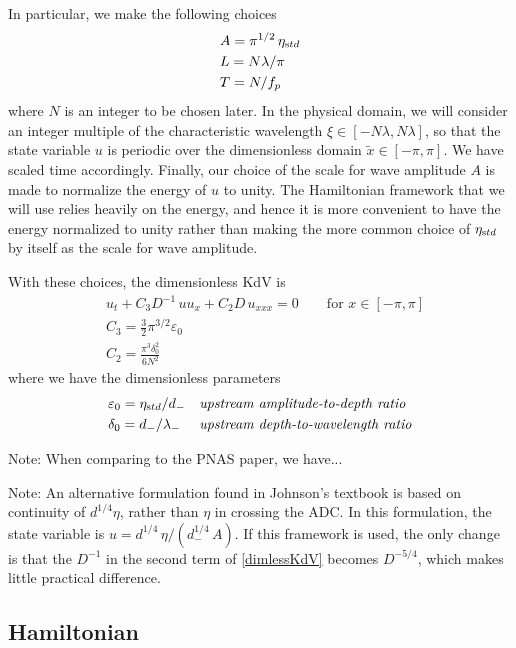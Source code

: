 \documentclass[11pt]{article}
\newcommand{\eps}{\varepsilon}
\newcommand{\freqp}{f_p}
\newcommand{\ampscale}{A}
\newcommand{\etastd}{\eta_{\text std}}
\newcommand{\depth}{d}
\newcommand{\dup}{\depth_{-}}
\newcommand{\lam}{\lambda}
\newcommand{\lamup}{\lam_{-}}
\newcommand{\lamfac}{N}
\newcommand{\drat}{D}
\newcommand{\epsup}{\eps_0}
\newcommand{\delup}{\delta_0}
\begin{document}
In particular, we make the following choices
\begin{align}
&\ampscale = \pi^{1/2} \, \etastd \\
&L = \lamfac \lam / \pi \\
&T = \lamfac / \freqp
\end{align}
where $\lamfac$ is an integer to be chosen later. In the physical domain, we will consider an integer multiple of the characteristic wavelength $\xi \in [-\lamfac \lam, \lamfac \lam]$, so that the state variable $u$ is periodic over the  dimensionless domain $\tilde{x} \in [-\pi, \pi]$. We have scaled time accordingly. Finally, our choice of the scale for wave amplitude $\ampscale$ is made to normalize the energy of $u$ to unity. The Hamiltonian framework that we will use relies heavily on the energy, and hence it is more convenient to have the energy normalized to unity rather than making the more common choice of $\etastd$ by itself as the scale for wave amplitude.

With these choices, the dimensionless KdV is
\begin{align}
\label{dimlessKdV}
&u_t + C_3 \drat^{-1} \, u u_x + C_2 \drat \, u_{xxx} = 0
\qquad \text{for } x \in [-\pi,\pi] \\
&C_3 = \frac{3}{2} \pi^{3/2} \epsup  \\
&C_2 = \frac{\pi^3 \delup^2}{6 \lamfac^2} 
\end{align}
where we have the dimensionless parameters
\begin{align}
&\epsup = \etastd / \dup
&&\mbox{\em upstream amplitude-to-depth ratio} \\
&\delup = \dup / \lamup
&&\mbox{\em upstream depth-to-wavelength ratio}
\end{align}

Note: When comparing to the PNAS paper, we have...

Note: An alternative formulation found in Johnson's textbook is based on continuity of $\depth^{1/4} \eta$, rather than $\eta$ in crossing the ADC. In this formulation, the state variable is $u = \depth^{1/4} \, \eta / (\dup^{1/4} \, \ampscale)$. If this framework is used, the only change is that the $D^{-1}$ in the second term of \eqref{dimlessKdV} becomes $D^{-5/4}$, which makes little practical difference.


\subsection{Hamiltonian}
\end{document}
